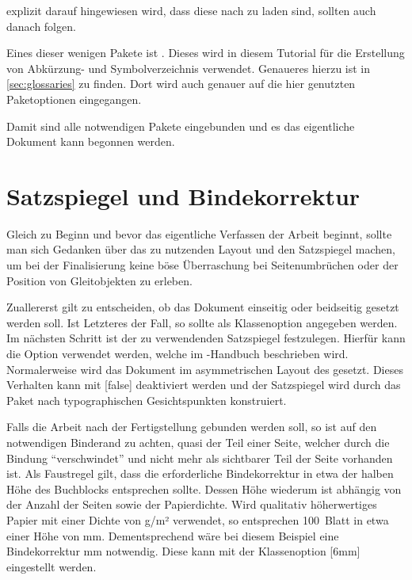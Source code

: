 \documentclass[%
  english,ngerman,%
  geometry=no,DIV=12,automark,%
]{tudscrartcl}
\begin{document}
explizit darauf hingewiesen wird, dass diese nach  zu laden 
sind, sollten auch danach folgen.
%
\begin{Tutorial*}
\usepackage[colorlinks,linkcolor=blue]{hyperref}
\end{Tutorial*}
%
Eines dieser wenigen Pakete ist . Dieses wird in diesem 
Tutorial für die Erstellung von Abkürzung- und Symbolverzeichnis verwendet. 
Genaueres hierzu ist in \autoref{sec:glossaries} zu finden. Dort wird auch 
genauer auf die hier genutzten Paketoptionen eingegangen.
%
\begin{Tutorial*}
\usepackage[%
  automake,%
  acronym,%
  symbols,%
  nomain,%
  translate=babel,%
  nogroupskip,%
  toc,%
  section=section,%
]{glossaries}
\makeglossaries
\end{Tutorial*}
%
Damit sind alle notwendigen Pakete eingebunden und es das eigentliche Dokument 
kann begonnen werden.
\begin{Tutorial*}
\begin{document}
\end{Tutorial*}



\section{Satzspiegel und Bindekorrektur}
Gleich zu Beginn und bevor das eigentliche Verfassen der Arbeit beginnt, sollte 
man sich Gedanken über das zu nutzenden Layout und den Satzspiegel machen, um 
bei der Finalisierung keine böse Überraschung bei Seitenumbrüchen oder der 
Position von Gleitobjekten zu erleben.

Zuallererst gilt zu entscheiden, ob das Dokument einseitig oder beidseitig 
gesetzt werden soll. Ist Letzteres der Fall, so sollte  als 
Klassenoption angegeben werden. Im nächsten Schritt ist der zu verwendenden 
Satzspiegel festzulegen. Hierfür kann die Option  verwendet 
werden, welche im \TUDScript-Handbuch beschrieben wird. Normalerweise wird das 
Dokument im asymmetrischen Layout des \CDs gesetzt. Dieses Verhalten kann mit 
[false] deaktiviert werden und der Satzspiegel wird durch das 
Paket  nach typographischen Gesichtspunkten konstruiert.

Falls die Arbeit nach der Fertigstellung gebunden werden soll, so ist auf den 
notwendigen Binderand zu achten, quasi der Teil einer Seite, welcher durch die 
Bindung \enquote{verschwindet} und nicht mehr als sichtbarer Teil der Seite 
vorhanden ist. Als Faustregel gilt, dass die erforderliche Bindekorrektur in 
etwa der halben Höhe des Buchblocks entsprechen sollte. Dessen Höhe wiederum 
ist abhängig von der Anzahl der Seiten sowie der Papierdichte. Wird qualitativ 
höherwertiges Papier mit einer Dichte von \unit[100]{g/m²} verwendet, so 
entsprechen 100~Blatt in etwa einer Höhe von \unit[12]{mm}. Dementsprechend 
wäre bei diesem Beispiel eine Bindekorrektur \unit[6]{mm} notwendig. Diese 
kann mit der Klassenoption [6mm] eingestellt werden.
\end{document}
